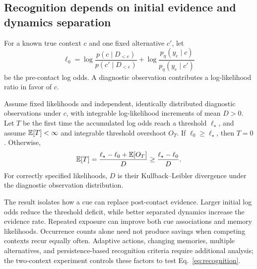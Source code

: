 \subsection{Recognition depends on initial evidence and dynamics separation}
For a known true context $c$ and one fixed alternative $c'$, let
\[
 \ell_0=\log\frac{p(c\mid D_{<e})}{p(c'\mid D_{<e})}
       +\log\frac{p_\eta(y_e\mid c)}{p_\eta(y_e\mid c')}
\]
be the pre-contact log odds. A diagnostic observation contributes a log-likelihood ratio in favor of $c$.
\begin{proposition}\label{prop:recognition}
Assume fixed likelihoods and independent, identically distributed diagnostic observations under $c$, with integrable log-likelihood increments of mean $D>0$. Let $T$ be the first time the accumulated log odds reach a threshold $\ell_\star$, and assume $\mathbb{E}[T]<\infty$ and integrable threshold overshoot $O_T$. If $\ell_0\geq\ell_\star$, then $T=0$. Otherwise,
\begin{equation}\label{eq:recognition}
 \mathbb{E}[T]=\frac{\ell_\star-\ell_0+\mathbb{E}[O_T]}{D}
 \geq\frac{\ell_\star-\ell_0}{D}.
\end{equation}
For correctly specified likelihoods, $D$ is their Kullback--Leibler divergence under the diagnostic observation distribution.
\end{proposition}
The result isolates how a cue can replace post-contact evidence. Larger initial log odds reduce the threshold deficit, while better separated dynamics increase the evidence rate. Repeated exposure can improve both cue associations and memory likelihoods. Occurrence counts alone need not produce savings when competing contexts recur equally often. Adaptive actions, changing memories, multiple alternatives, and persistence-based recognition criteria require additional analysis; the two-context experiment controls these factors to test Eq.~\eqref{eq:recognition}.


